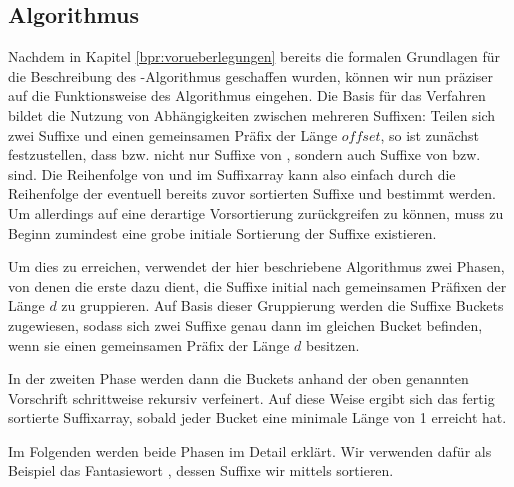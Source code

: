 \subsection{Algorithmus}
\label{bpr:algorithmus}

Nachdem in Kapitel \ref{bpr:vorueberlegungen} bereits die formalen Grundlagen für die Beschreibung des \bpr-Algorithmus geschaffen wurden, können wir nun präziser auf die Funktionsweise des Algorithmus eingehen. Die Basis für das Verfahren bildet die Nutzung von Abhängigkeiten zwischen mehreren Suffixen: Teilen sich zwei Suffixe  und  einen gemeinsamen Präfix der Länge \(\textit{offset}\), so ist zunächst festzustellen, dass  bzw.  nicht nur Suffixe von , sondern auch Suffixe von  bzw.   sind. Die Reihenfolge von  und  im Suffixarray kann also einfach durch die Reihenfolge der eventuell bereits zuvor sortierten Suffixe  und  bestimmt werden. Um allerdings auf eine derartige Vorsortierung zurückgreifen zu können, muss zu Beginn zumindest eine grobe \glqq initiale Sortierung\grqq{} der Suffixe existieren.\par\smallskip
Um dies zu erreichen, verwendet der hier beschriebene Algorithmus zwei Phasen, von denen die erste dazu dient, die Suffixe initial nach gemeinsamen Präfixen der Länge \(d\) zu gruppieren. Auf Basis dieser Gruppierung werden die Suffixe Buckets zugewiesen, sodass sich zwei Suffixe genau dann im gleichen Bucket befinden, wenn sie einen gemeinsamen Präfix der Länge \(d\) besitzen.\par
In der zweiten Phase werden dann die Buckets anhand der oben genannten Vorschrift schrittweise rekursiv verfeinert. Auf diese Weise ergibt sich das fertig sortierte Suffixarray, sobald jeder Bucket eine minimale Länge von 1 erreicht hat.\par\smallskip
Im Folgenden werden beide Phasen im Detail erklärt. Wir verwenden dafür als Beispiel das Fantasiewort \covfefefe, dessen Suffixe wir mittels \bpr sortieren.




